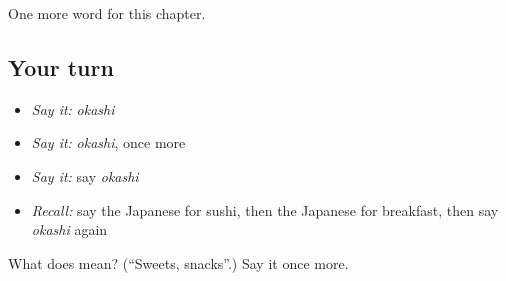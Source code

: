 \begin{grammarlens}[title={What you've built}]
One more word for this chapter.
\end{grammarlens}

\subsection*{Your turn}
\begin{itemize}
\raggedright
  \item \emph{Say it:} \emph{okashi}
  \item \emph{Say it:} \emph{okashi}, once more
  \item \emph{Say it:} say \emph{okashi}
  \item \emph{Recall:} say the Japanese for sushi, then the Japanese for breakfast, then say \emph{okashi} again
\end{itemize}

\begin{tcolorbox}[breakable,colback=teal!4,colframe=teal!35!black,title={Before you move on}]
What does  mean? (\textquotedblleft{}Sweets, snacks\textquotedblright{}.) Say it once more.
\end{tcolorbox}
